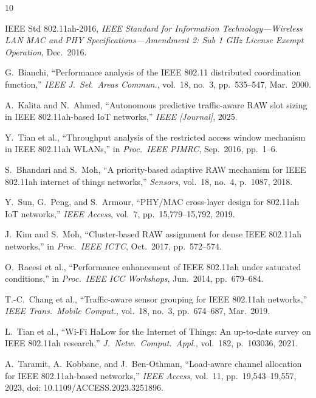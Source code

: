 \documentclass[conference]{IEEEtran}
\begin{document}
\balance
\begin{thebibliography}{10}

IEEE Std 802.11ah-2016,
\textit{IEEE Standard for Information Technology---Wireless LAN MAC and
PHY Specifications---Amendment 2: Sub 1 GHz License Exempt Operation},
Dec.\ 2016.

G.~Bianchi,
``Performance analysis of the IEEE 802.11 distributed coordination function,''
\textit{IEEE J.\ Sel.\ Areas Commun.}, vol.~18, no.~3, pp.~535--547,
Mar.\ 2000.

A.~Kalita and N.~Ahmed,
``Autonomous predictive traffic-aware RAW slot sizing in IEEE 802.11ah-based
IoT networks,''
\textit{IEEE [Journal]}, 2025.

Y.~Tian et al.,
``Throughput analysis of the restricted access window mechanism in
IEEE 802.11ah WLANs,''
in \textit{Proc.\ IEEE PIMRC}, Sep.\ 2016, pp.~1--6.

S.~Bhandari and S.~Moh,
``A priority-based adaptive RAW mechanism for IEEE 802.11ah
internet of things networks,''
\textit{Sensors}, vol.~18, no.~4, p.~1087, 2018.

Y.~Sun, G.~Peng, and S.~Armour,
``PHY/MAC cross-layer design for 802.11ah IoT networks,''
\textit{IEEE Access}, vol.~7, pp.~15{,}779--15{,}792, 2019.

J.~Kim and S.~Moh,
``Cluster-based RAW assignment for dense IEEE 802.11ah networks,''
in \textit{Proc.\ IEEE ICTC}, Oct.\ 2017, pp.~572--574.

O.~Raeesi et al.,
``Performance enhancement of IEEE 802.11ah under saturated conditions,''
in \textit{Proc.\ IEEE ICC Workshops}, Jun.\ 2014, pp.~679--684.

T.-C.~Chang et al.,
``Traffic-aware sensor grouping for IEEE 802.11ah networks,''
\textit{IEEE Trans.\ Mobile Comput.}, vol.~18, no.~3, pp.~674--687,
Mar.\ 2019.

L.~Tian et al.,
``Wi-Fi HaLow for the Internet of Things: An up-to-date survey on
IEEE 802.11ah research,''
\textit{J.\ Netw.\ Comput.\ Appl.}, vol.~182, p.~103036, 2021.

A.~Taramit, A.~Kobbane, and J.~Ben-Othman,
``Load-aware channel allocation for IEEE 802.11ah-based networks,''
\textit{IEEE Access}, vol.~11, pp.~19{,}543--19{,}557, 2023,
doi: 10.1109/ACCESS.2023.3251896.

\end{thebibliography}
\end{document}

